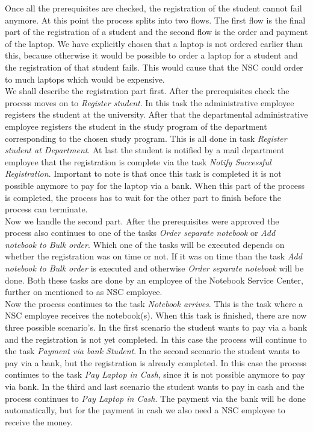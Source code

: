 \newpage

\noindent Once all the prerequisites are checked, the registration of the student cannot fail anymore. At this point the process splits into two flows. The first flow is the final part of the registration of a student and the second flow is the order and payment of the laptop. We have explicitly chosen that a laptop is not ordered earlier than this, because otherwise it would be possible to order a laptop for a student and the registration of that student fails. This would cause that the NSC could order to much laptops which would be expensive. \\
We shall describe the registration part first. After the prerequisites check the process moves on to \emph{Register student}. In this task the administrative employee registers the student at the university. After that the departmental administrative employee registers the student in the study program of the department corresponding to the chosen study program. This is all done in task \emph{Register student at Department}. At last the student is notified by a mail department employee that the registration is complete via the task \emph{Notify Successful Registration}. Important to note is that once this task is completed it is not possible anymore to pay for the laptop via a bank. When this part of the process is completed, the process has to wait for the other part to finish before the process can terminate.\\
Now we handle the second part. After the prerequisites were approved the process also continues to one of the tasks \emph{Order separate notebook} or \emph{Add notebook to Bulk order}. Which one of the tasks will be executed depends on whether the registration was on time or not. If it was on time than the task \emph{Add notebook to Bulk order} is executed and otherwise \emph{Order separate notebook} will be done. Both these tasks are done by an employee of the Notebook Service Center, further on mentioned to as NSC employee.\\
Now the process continues to the task \emph{Notebook arrives}. This is the task where a NSC employee receives the notebook(s). When this task is finished, there are now three possible scenario's. In the first scenario the student wants to pay via a bank and the registration is not yet completed. In this case the process will continue to the task \emph{Payment via bank Student}. In the second scenario the student wants to pay via a bank, but the registration is already completed. In this case the process continues to the task \emph{Pay Laptop in Cash}, since it is not possible anymore to pay via bank. In the third and last scenario the student wants to pay in cash and the process continues to \emph{Pay Laptop in Cash}. The payment via the bank will be done automatically, but for the payment in cash we also need a NSC employee to receive the money.\\
